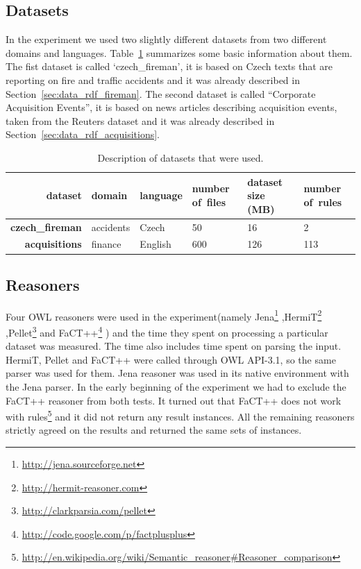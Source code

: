 \subsection{Datasets} \label{sec:onto_datasets}

In the experiment we used two slightly different datasets from two different domains and languages.  Table~\ref{tab:datasets} summarizes some basic information about them. The fist dataset is called `czech\_fireman', it is based on Czech texts that are reporting on fire and traffic accidents and it was already described in Section~\ref{sec:data_rdf_fireman}. The second dataset is called ``Corporate Acquisition Events'', it is based on news articles describing acquisition events, taken from the Reuters dataset and it was already described in Section~\ref{sec:data_rdf_acquisitions}.

\begin{table}
\begin{center}
\begin{tabular}{|r||l|l|b{20mm}|b{20mm}|b{20mm}|}
\hline
dataset & domain & language & number of~files &  dataset size (MB) &  number of~rules  \\
\hline
\hline
\textbf{czech\_fireman} & accidents & Czech &  50 &  16 &  2\\
\hline
\textbf{acquisitions} & finance & English &  600 &  126 &  113\\
\hline
\end{tabular}
\caption{Description of datasets that were used.}\label{tab:datasets}
\end{center}
\end{table}




\subsection{Reasoners}

Four OWL reasoners were used in the experiment(namely
Jena\footnote{\url{http://jena.sourceforge.net}}
,HermiT\footnote{\url{http://hermit-reasoner.com}}
,Pellet\footnote{\url{http://clarkparsia.com/pellet}}
and FaCT++\footnote{\url{http://code.google.com/p/factplusplus}}
) and the time they spent on processing a particular dataset was measured. The time also includes time spent on parsing the input. HermiT, Pellet and FaCT++ were called through OWL API-3.1, so the same parser was used for them. Jena reasoner was used in its native environment with the Jena parser.
In the early beginning of the experiment we had to exclude the FaCT++ reasoner from both tests. It turned out that FaCT++ does not work with rules\footnote{\url{http://en.wikipedia.org/wiki/Semantic_reasoner#Reasoner_comparison}} and it did not return any result instances.  All the remaining reasoners strictly agreed on the results and returned the same sets of instances.

